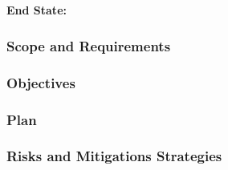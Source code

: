 \subsection{ \nnsa}\label{subsect:nnsa}

\textbf{End State:} 

\subsubsection{Scope and Requirements}
\subsubsection{Objectives}
\subsubsection{Plan}
\subsubsection{Risks and Mitigations Strategies}
